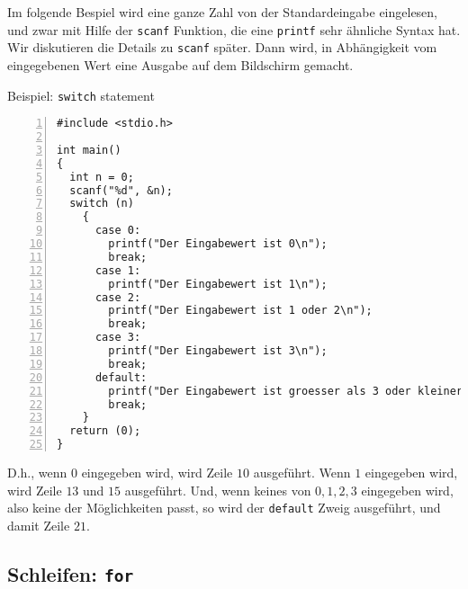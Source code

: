 Im folgende Bespiel wird eine ganze Zahl von der Standardeingabe eingelesen, und zwar mit Hilfe der \verb|scanf| Funktion, die eine \verb|printf| sehr ähnliche Syntax hat.
Wir diskutieren die Details zu \verb|scanf| später.
Dann wird, in Abhängigkeit vom eingegebenen Wert eine Ausgabe auf dem Bildschirm gemacht.
\begin{myexampleprogram}{Beispiel: \texttt{switch} statement}
\begin{lstlisting}[numbers=left]
#include <stdio.h>

int main()
{
  int n = 0;
  scanf("%d", &n);
  switch (n)
    {
      case 0:
        printf("Der Eingabewert ist 0\n");
        break;
      case 1:
        printf("Der Eingabewert ist 1\n");
      case 2:
        printf("Der Eingabewert ist 1 oder 2\n");
        break;
      case 3:
        printf("Der Eingabewert ist 3\n");
        break;
      default:
        printf("Der Eingabewert ist groesser als 3 oder kleiner als 0\n");
        break;
    }
  return (0);
}
\end{lstlisting}
\end{myexampleprogram}
D.h., wenn $0$ eingegeben wird, wird Zeile $10$ ausgeführt.
Wenn $1$ eingegeben wird, wird Zeile $13$ und $15$ ausgeführt.
Und, wenn keines von $0,1,2,3$ eingegeben wird, also keine der Möglichkeiten passt, so wird der \verb|default| Zweig ausgeführt, und damit Zeile $21$.

\subsection{Schleifen: \texttt{for}}

